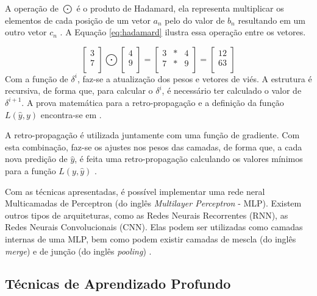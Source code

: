 A operação de $\bigodot$ é o produto de Hadamard, ela representa multiplicar os elementos de cada posição de um vetor $a_{n}$ pelo do valor de $b_{n}$ resultando em um outro vetor $c_{n}$ \cite{nielsen_neural_2015}. A Equação \ref{eq:hadamard} ilustra essa operação entre os vetores.

\begin{equation}
	\label{eq:hadamard}
	\begin{bmatrix}
    	3 \\
        7 \\
	\end{bmatrix}
    \bigodot
    \begin{bmatrix}
    	4 \\
        9 \\
	\end{bmatrix}
    =
    \begin{bmatrix}
       3 & * & 4 \\
       7 & * & 9 \\
    \end{bmatrix}
     =
    \begin{bmatrix}
    	12 \\
        63 \\
	\end{bmatrix}     
\end{equation}
Com a função de $\delta^{i}$, faz-se a atualização dos pesos e vetores de viés. A estrutura é recursiva, de forma que, para calcular o $\delta^{i}$, é necessário ter calculado o valor de $\delta^{i+1}$. A prova matemática para a retro-propagação e a definição da função $L(\hat{y}, y)$ encontra-se em .

A retro-propagação é utilizada juntamente com uma função de gradiente. Com esta combinação, faz-se os ajustes nos pesos das camadas, de forma que, a cada nova predição de $\hat{y}$, é feita uma retro-propagação calculando os valores mínimos para a função $L(y, \hat{y})$ \cite{nielsen_neural_2015}.

Com as técnicas apresentadas, é possível implementar uma rede neral Multicamadas de Perceptron (do inglês \textit{Multilayer Perceptron} - MLP). Existem outros tipos de arquiteturas, como as Redes Neurais Recorrentes (RNN), as Redes Neurais Convolucionais (CNN). Elas podem ser utilizadas como camadas internas de uma MLP, bem como podem existir camadas de mescla (do inglês \textit{merge}) e de junção (do inglês \textit{pooling}) \cite{goldberg_neural_2017}.

\subsection{Técnicas de Aprendizado Profundo}

